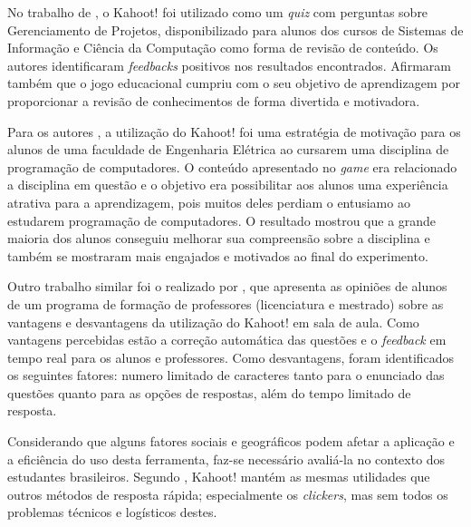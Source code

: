  No trabalho de , o Kahoot! foi utilizado como um \textit{quiz} com perguntas sobre Gerenciamento de Projetos, disponibilizado para alunos dos cursos de Sistemas de
Informação e Ciência da Computação como forma de revisão de conteúdo. Os autores identificaram \textit{feedbacks} positivos nos resultados encontrados. Afirmaram também que o jogo educacional cumpriu com o seu objetivo de aprendizagem por proporcionar a revisão de conhecimentos de forma divertida e motivadora.

Para os autores , a utilização do Kahoot! foi uma estratégia de motivação para os alunos de uma faculdade de Engenharia Elétrica ao cursarem uma disciplina de programação de computadores. O conteúdo apresentado no \textit{game} era relacionado a disciplina em questão e o objetivo era possibilitar aos alunos uma experiência atrativa para a aprendizagem, pois muitos deles perdiam o entusiamo ao estudarem programação de computadores. O resultado mostrou que a grande maioria dos alunos conseguiu melhorar sua  compreensão sobre a disciplina e também se mostraram mais engajados e motivados ao final do experimento.

Outro trabalho similar foi o realizado por , que apresenta as opiniões de alunos de um programa de formação de professores (licenciatura e mestrado) sobre as vantagens e desvantagens da utilização do Kahoot! em sala de aula. Como vantagens percebidas estão a correção automática das questões e o \textit{feedback} em tempo real para os alunos e professores. Como desvantagens, foram identificados os seguintes fatores: numero limitado de caracteres tanto para o enunciado das questões quanto para as opções de respostas, além do tempo limitado de resposta.

 Considerando que alguns fatores sociais e geográficos podem afetar a aplicação e a eficiência do uso desta ferramenta, faz-se necessário avaliá-la no contexto dos estudantes brasileiros. Segundo , Kahoot! mantém as mesmas utilidades que outros métodos de resposta rápida; especialmente os \textit{clickers}, mas sem todos os problemas técnicos e logísticos destes.

